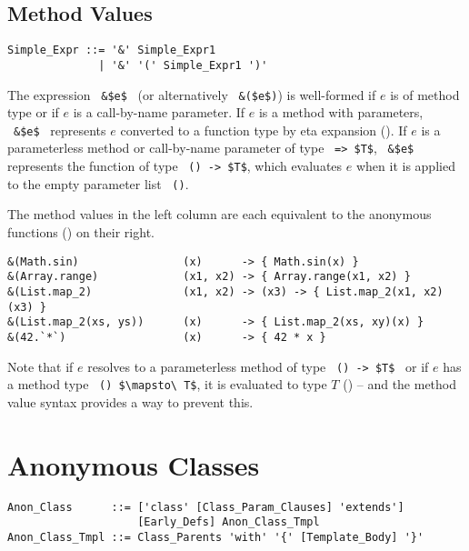\subsection{Method Values}
\label{sec:method-values}

\syntax\begin{lstlisting}
Simple_Expr ::= '&' Simple_Expr1
              | '&' '(' Simple_Expr1 ')'
\end{lstlisting}

The expression ~\lstinline!&$e$!~ (or alternatively ~\lstinline!&($e$)!) is well-formed if $e$ is of method type or if $e$ is a call-by-name parameter. If $e$ is a method with parameters, ~\lstinline!&$e$!~ represents $e$ converted to a function type by eta expansion (). If $e$ is a parameterless method or call-by-name parameter of type ~\lstinline!=> $T$!, ~\lstinline!&$e$!~ represents the function of type ~\lstinline!() -> $T$!, which evaluates $e$ when it is applied to the empty parameter list ~\lstinline!()!. 

\example The method values in the left column are each equivalent to the anonymous functions () on their right. 
\begin{lstlisting}[deletekeywords={range}]
&(Math.sin)                (x)      -> { Math.sin(x) }
&(Array.range)             (x1, x2) -> { Array.range(x1, x2) }
&(List.map_2)              (x1, x2) -> (x3) -> { List.map_2(x1, x2)(x3) }
&(List.map_2(xs, ys))      (x)      -> { List.map_2(xs, xy)(x) }
&(42.`*`)                  (x)      -> { 42 * x }
\end{lstlisting}

Note that if $e$ resolves to a parameterless method of type ~\lstinline!() -> $T$!~ or if $e$ has a method type ~\lstinline!() $\mapsto\ T$!, it is evaluated to type $T$ () -- and the method value syntax provides a way to prevent this. 





\section{Anonymous Classes}
\label{sec:anonymous-classes}

\syntax\begin{lstlisting}
Anon_Class      ::= ['class' [Class_Param_Clauses] 'extends'] 
                    [Early_Defs] Anon_Class_Tmpl
Anon_Class_Tmpl ::= Class_Parents 'with' '{' [Template_Body] '}'
\end{lstlisting}

